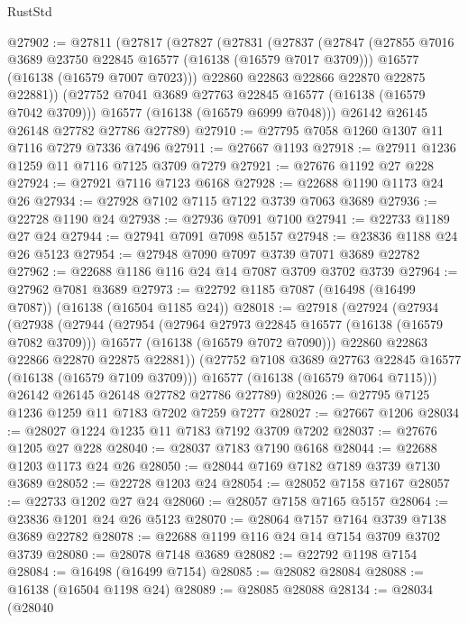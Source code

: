 \begin{lexlean}{RustStd}
\begin{coremodule}
@27902 := @27811
    (@27817
      (@27827
        (@27831
          (@27837
            (@27847
              (@27855 @7016 @3689 @23750 @22845 @16577 (@16138 (@16579 @7017 @3709)))
              @16577
              (@16138 (@16579 @7007 @7023)))
            @22860
            @22863
            @22866
            @22870
            @22875
            @22881))
        (@27752 @7041 @3689 @27763 @22845 @16577 (@16138 (@16579 @7042 @3709)))
        @16577
        (@16138 (@16579 @6999 @7048)))
      @26142
      @26145
      @26148
      @27782
      @27786
      @27789)
@27910 := @27795 @7058 @1260 @1307 @11 @7116 @7279 @7336 @7496
@27911 := @27667 @1193
@27918 := @27911 @1236 @1259 @11 @7116 @7125 @3709 @7279
@27921 := @27676 @1192 @27 @228
@27924 := @27921 @7116 @7123 @6168
@27928 := @22688 @1190 @1173 @24 @26
@27934 := @27928 @7102 @7115 @7122 @3739 @7063 @3689
@27936 := @22728 @1190 @24
@27938 := @27936 @7091 @7100
@27941 := @22733 @1189 @27 @24
@27944 := @27941 @7091 @7098 @5157
@27948 := @23836 @1188 @24 @26 @5123
@27954 := @27948 @7090 @7097 @3739 @7071 @3689 @22782
@27962 := @22688 @1186 @116 @24 @14 @7087 @3709 @3702 @3739
@27964 := @27962 @7081 @3689
@27973 := @22792 @1185 @7087 (@16498 (@16499 @7087)) (@16138 (@16504 @1185 @24))
@28018 := @27918
    (@27924
      (@27934
        (@27938
          (@27944
            (@27954
              (@27964 @27973 @22845 @16577 (@16138 (@16579 @7082 @3709)))
              @16577
              (@16138 (@16579 @7072 @7090)))
            @22860
            @22863
            @22866
            @22870
            @22875
            @22881))
        (@27752 @7108 @3689 @27763 @22845 @16577 (@16138 (@16579 @7109 @3709)))
        @16577
        (@16138 (@16579 @7064 @7115)))
      @26142
      @26145
      @26148
      @27782
      @27786
      @27789)
@28026 := @27795 @7125 @1236 @1259 @11 @7183 @7202 @7259 @7277
@28027 := @27667 @1206
@28034 := @28027 @1224 @1235 @11 @7183 @7192 @3709 @7202
@28037 := @27676 @1205 @27 @228
@28040 := @28037 @7183 @7190 @6168
@28044 := @22688 @1203 @1173 @24 @26
@28050 := @28044 @7169 @7182 @7189 @3739 @7130 @3689
@28052 := @22728 @1203 @24
@28054 := @28052 @7158 @7167
@28057 := @22733 @1202 @27 @24
@28060 := @28057 @7158 @7165 @5157
@28064 := @23836 @1201 @24 @26 @5123
@28070 := @28064 @7157 @7164 @3739 @7138 @3689 @22782
@28078 := @22688 @1199 @116 @24 @14 @7154 @3709 @3702 @3739
@28080 := @28078 @7148 @3689
@28082 := @22792 @1198 @7154
@28084 := @16498 (@16499 @7154)
@28085 := @28082 @28084
@28088 := @16138 (@16504 @1198 @24)
@28089 := @28085 @28088
@28134 := @28034
    (@28040

\end{coremodule}
\end{lexlean}

